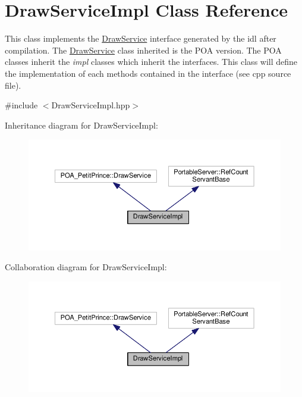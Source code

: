 \hypertarget{class_draw_service_impl}{}\section{Draw\+Service\+Impl Class Reference}
\label{class_draw_service_impl}


This class implements the \hyperlink{class_draw_service}{Draw\+Service} interface generated by the idl after compilation. The \hyperlink{class_draw_service}{Draw\+Service} class inherited is the P\+OA version. The P\+OA classes inherit the {\itshape impl} classes which inherit the interfaces. This class will define the implementation of each methods contained in the interface (see cpp source file).  




{\ttfamily \#include $<$Draw\+Service\+Impl.\+hpp$>$}



Inheritance diagram for Draw\+Service\+Impl\+:
\nopagebreak
\begin{figure}[H]
\begin{center}
\leavevmode
\includegraphics[width=350pt]{class_draw_service_impl__inherit__graph}
\end{center}
\end{figure}


Collaboration diagram for Draw\+Service\+Impl\+:
\nopagebreak
\begin{figure}[H]
\begin{center}
\leavevmode
\includegraphics[width=350pt]{class_draw_service_impl__coll__graph}
\end{center}
\end{figure}
